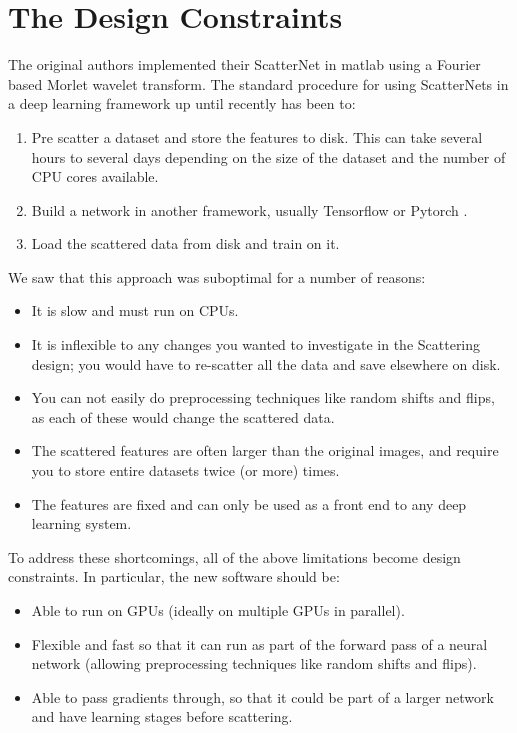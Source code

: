 \section{The Design Constraints}
The original authors implemented their ScatterNet in matlab \cite{oyallon_deep_2015} using
a Fourier based Morlet wavelet transform. 
The standard procedure for using ScatterNets in a deep learning
framework up until recently has been to:
\begin{enumerate}
  \item Pre scatter a dataset and store the features to disk. This can take
    several hours to several days depending on the size of the dataset and the
    number of CPU cores available.
  \item Build a network in another framework, usually Tensorflow \cite{abadi_tensorflow:_2015}
    or Pytorch \cite{paszke_automatic_2017}.
  \item Load the scattered data from disk and train on it.
\end{enumerate} 
We saw that this approach was suboptimal for a number of reasons:
\begin{itemize}
  \item It is slow and must run on CPUs.
  \item It is inflexible to any changes you wanted to investigate in the
    Scattering design; you would have to re-scatter all the data and save
    elsewhere on disk.
  \item You can not easily do preprocessing techniques like random shifts and
    flips, as each of these would change the scattered data.
  \item The scattered features are often larger than the original images, and 
    require you to store entire datasets twice (or more) times.
  \item The features are fixed and can only be used as a front end to any
    deep learning system.
\end{itemize}

To address these shortcomings, all of the above limitations become design
constraints. In particular, the new software should be:
\begin{itemize}
  \item Able to run on GPUs (ideally on multiple GPUs in parallel).
  \item Flexible and fast so that it can run as part of the forward pass of
    a neural network (allowing preprocessing techniques like random shifts and
    flips).
  \item Able to pass gradients through, so that it could be part of a larger
    network and have learning stages before scattering.
\end{itemize}

